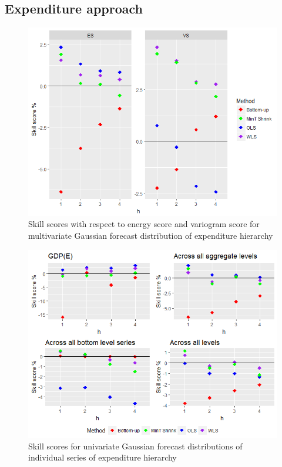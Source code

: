 \documentclass[graybox]{svmult}
\begin{document}
\subsection*{Expenditure approach}

\begin{figure}[H]
	\centering
	\small
	\includegraphics[scale=0.50]{Figs/Results/EXP-ProbGaussF-MultivS_ES_VS.PNG}
	\caption{Skill scores with respect to energy score and variogram score for multivariate Gaussian forecast distribution of expenditure hierarchy}\label{Exp_ProbGaus_ES_VS}
\end{figure}

\begin{figure}[H]
	\centering
	\small
	\includegraphics[scale=0.50]{Figs/Results/EXP-ProbGaussF-UnivS_CRPS.PNG}
	\caption{Skill scores for univariate Gaussian forecast distributions of individual series of expenditure hierarchy}\label{Exp_ProbGaus_UnivS}
\end{figure}
\end{document}

